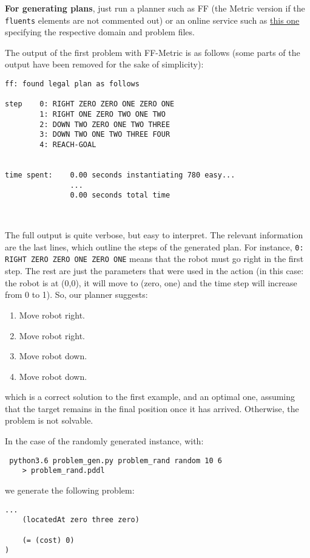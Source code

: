\documentclass{article}
\begin{document}
\begin{enumerate}
\textbf{For generating plans}, just run a planner such as FF (the Metric version if the \texttt{fluents} elements are not commented out) or an online service such as \color{purple} \href{http://editor.planning.domains}{this one} \color{black} specifying the respective domain and problem files.

The output of the first problem with FF-Metric is as follows (some parts of the output have been removed for the sake of simplicity):
\begin{verbatim}
ff: found legal plan as follows

step    0: RIGHT ZERO ZERO ONE ZERO ONE
        1: RIGHT ONE ZERO TWO ONE TWO
        2: DOWN TWO ZERO ONE TWO THREE
        3: DOWN TWO ONE TWO THREE FOUR
        4: REACH-GOAL
     

time spent:    0.00 seconds instantiating 780 easy...
               ...
               0.00 seconds total time



\end{verbatim}


The full output is quite verbose, but easy to interpret. The relevant information are the last lines, which outline the steps of the generated plan. For instance, \texttt{0: RIGHT ZERO ZERO ONE ZERO ONE} means that the robot must go right in the first step. The rest are just the parameters that were used in the action (in this case: the robot is at (0,0), it will move to (zero, one) and the time step will increase from 0 to 1). So, our planner suggests:
\begin{enumerate}
    \item Move robot right.
    \item Move robot right.
    \item Move robot down.
    \item Move robot down.
\end{enumerate}
which is a correct solution to the first example, and an optimal one, assuming that the target remains in the final position once it has arrived. Otherwise, the problem is not solvable.

In the case of the randomly generated instance, with:
\begin{verbatim}
 python3.6 problem_gen.py problem_rand random 10 6
    > problem_rand.pddl
\end{verbatim}
we generate the following problem:
\begin{verbatim}
...
    (locatedAt zero three zero)

    (= (cost) 0)
)


\end{verbatim}
\end{enumerate}
\end{document}
